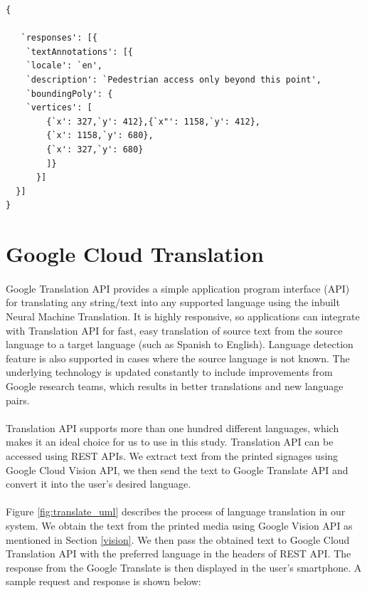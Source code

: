 \documentclass[12pt]{article}
\begin{document}
\begin{lstlisting}
{
   
   `responses': [{
	`textAnnotations': [{
	`locale': `en',
	`description': `Pedestrian access only beyond this point',
	`boundingPoly': {
	`vertices': [
		{`x': 327,`y': 412},{`x"': 1158,`y': 412},
		{`x': 1158,`y': 680},
		{`x': 327,`y': 680}
		]}
	  }]
  }]
}
\end{lstlisting}


\section{Google Cloud Translation}
\label{translate}

\paragraph{}Google Translation API provides a simple application program interface (API) for translating any string/text into any supported language using the inbuilt Neural Machine Translation. It is highly responsive, so applications can integrate with Translation API for fast, easy translation of source text from the source language to a target language (such as Spanish to English). Language detection feature is also supported in cases where the source language is not known. The underlying technology is updated constantly to include improvements from Google research teams, which results in better translations and new language pairs.

\paragraph{}Translation API supports more than one hundred different languages, which makes it an ideal choice for us to use in this study. Translation API can be accessed using REST APIs. We extract text from the printed signages using Google Cloud Vision API, we then send the text to Google Translate API and convert it into the user's desired language.

\paragraph{}Figure \ref{fig:translate_uml} describes the process of language translation in our system. We obtain the text from the printed media using Google Vision API as mentioned in Section \ref{vision}. We then pass the obtained text to Google Cloud Translation API with the preferred language in the headers of REST API. The response from the Google Translate is then displayed in the user's smartphone. A sample request and response is shown below:
\end{document}
